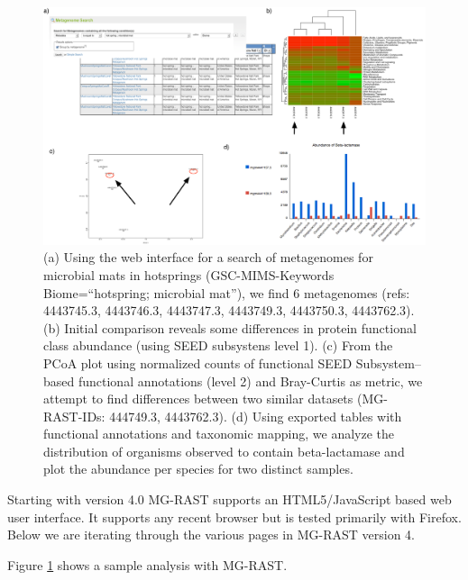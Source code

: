 \documentclass[12pt,fullpage]{report}
\begin{document}
\begin{figure}
\begin{center}
\includegraphics[width=6in]{Images/quad-chart-analysis-example.png}
\end{center}
\caption{
(a) Using the web interface for a search of metagenomes for microbial mats in hotsprings (GSC-MIMS-Keywords Biome=``hotspring; microbial mat''), we find 6 metagenomes (refs: 4443745.3, 4443746.3, 4443747.3, 4443749.3, 4443750.3, 4443762.3). (b) Initial comparison reveals some differences in protein functional class abundance (using \gls{SEED} subsystens level 1). (c) From the PCoA plot using normalized counts of functional \gls{SEED} \gls{Subsystem}--based functional annotations (level 2) and Bray-Curtis as metric, we attempt to find differences between two similar datasets (MG-RAST-IDs: 444749.3, 4443762.3). (d) Using exported tables with functional annotations and taxonomic mapping, we analyze the distribution of organisms observed to contain beta-lactamase and plot the abundance per species for two distinct samples.
}
\label{fig:quad-chart-analysis-example}
\end{figure}

Starting with version 4.0 MG-RAST supports an HTML5/JavaScript based web user interface. It supports any recent browser but is tested primarily with Firefox.\\

Below we are iterating through the various pages in MG-RAST version 4.


Figure \ref{fig:quad-chart-analysis-example} shows a sample analysis with MG-RAST.

\end{document}
